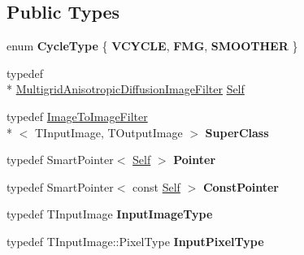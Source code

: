 \subsection*{Public Types}
\begin{DoxyCompactItemize}
\item 
enum {\bfseries Cycle\-Type} \{ {\bfseries V\-C\-Y\-C\-L\-E}, 
{\bfseries F\-M\-G}, 
{\bfseries S\-M\-O\-O\-T\-H\-E\-R}
 \}
\item 
typedef \\*
\hyperlink{classitk_1_1_multigrid_anisotropic_diffusion_image_filter}{Multigrid\-Anisotropic\-Diffusion\-Image\-Filter} \hyperlink{classitk_1_1_multigrid_anisotropic_diffusion_image_filter_a7a4e0d1647645c6de01cb808db77bc5a}{Self}
\item 
\hypertarget{classitk_1_1_multigrid_anisotropic_diffusion_image_filter_ab6e9fe3918a768ae1e14d785f2ad8e36}{typedef \hyperlink{class_image_to_image_filter}{Image\-To\-Image\-Filter}\\*
$<$ T\-Input\-Image, T\-Output\-Image $>$ {\bfseries Super\-Class}}\label{classitk_1_1_multigrid_anisotropic_diffusion_image_filter_ab6e9fe3918a768ae1e14d785f2ad8e36}

\item 
\hypertarget{classitk_1_1_multigrid_anisotropic_diffusion_image_filter_ab01db8d5b9b3fd8b955e63b3c38138b6}{typedef Smart\-Pointer$<$ \hyperlink{classitk_1_1_multigrid_anisotropic_diffusion_image_filter_a7a4e0d1647645c6de01cb808db77bc5a}{Self} $>$ {\bfseries Pointer}}\label{classitk_1_1_multigrid_anisotropic_diffusion_image_filter_ab01db8d5b9b3fd8b955e63b3c38138b6}

\item 
\hypertarget{classitk_1_1_multigrid_anisotropic_diffusion_image_filter_a1ba3f17f7f1e7fc199a60e30b30a0946}{typedef Smart\-Pointer$<$ const \hyperlink{classitk_1_1_multigrid_anisotropic_diffusion_image_filter_a7a4e0d1647645c6de01cb808db77bc5a}{Self} $>$ {\bfseries Const\-Pointer}}\label{classitk_1_1_multigrid_anisotropic_diffusion_image_filter_a1ba3f17f7f1e7fc199a60e30b30a0946}

\item 
\hypertarget{classitk_1_1_multigrid_anisotropic_diffusion_image_filter_a3f91cd5dff5b6d570a2b8d5b76484e38}{typedef T\-Input\-Image {\bfseries Input\-Image\-Type}}\label{classitk_1_1_multigrid_anisotropic_diffusion_image_filter_a3f91cd5dff5b6d570a2b8d5b76484e38}

\item 
\hypertarget{classitk_1_1_multigrid_anisotropic_diffusion_image_filter_a94aac911a4076c51758abe6747ed9b65}{typedef T\-Input\-Image\-::\-Pixel\-Type {\bfseries Input\-Pixel\-Type}}\label{classitk_1_1_multigrid_anisotropic_diffusion_image_filter_a94aac911a4076c51758abe6747ed9b65}


\end{DoxyCompactItemize}
